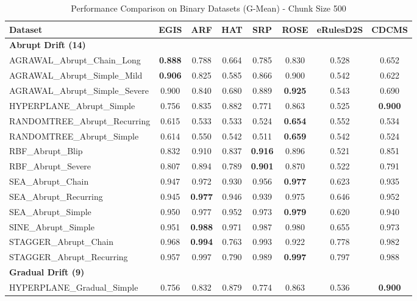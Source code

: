 \begin{table}[ht]
\centering
\caption{Performance Comparison on Binary Datasets (G-Mean) - Chunk Size 500}
\label{tab:binary_comparison}
\footnotesize
\begin{tabular}{l|ccccccc}
\toprule
\textbf{Dataset} & \textbf{EGIS} & \textbf{ARF} & \textbf{HAT} & \textbf{SRP} & \textbf{ROSE} & \textbf{eRulesD2S} & \textbf{CDCMS} \\
\midrule
\multicolumn{8}{l}{\textbf{Abrupt Drift (14)}} \\
AGRAWAL\_Abrupt\_Chain\_Long & \textbf{0.888} & 0.788 & 0.664 & 0.785 & 0.830 & 0.528 & 0.652 \\
AGRAWAL\_Abrupt\_Simple\_Mild & \textbf{0.906} & 0.825 & 0.585 & 0.866 & 0.900 & 0.542 & 0.622 \\
AGRAWAL\_Abrupt\_Simple\_Severe & 0.900 & 0.840 & 0.680 & 0.889 & \textbf{0.925} & 0.543 & 0.690 \\
HYPERPLANE\_Abrupt\_Simple & 0.756 & 0.835 & 0.882 & 0.771 & 0.863 & 0.525 & \textbf{0.900} \\
RANDOMTREE\_Abrupt\_Recurring & 0.615 & 0.533 & 0.533 & 0.524 & \textbf{0.654} & 0.552 & 0.534 \\
RANDOMTREE\_Abrupt\_Simple & 0.614 & 0.550 & 0.542 & 0.511 & \textbf{0.659} & 0.542 & 0.524 \\
RBF\_Abrupt\_Blip & 0.832 & 0.910 & 0.837 & \textbf{0.916} & 0.896 & 0.521 & 0.851 \\
RBF\_Abrupt\_Severe & 0.807 & 0.894 & 0.789 & \textbf{0.901} & 0.870 & 0.522 & 0.791 \\
SEA\_Abrupt\_Chain & 0.947 & 0.972 & 0.930 & 0.956 & \textbf{0.977} & 0.623 & 0.935 \\
SEA\_Abrupt\_Recurring & 0.945 & \textbf{0.977} & 0.946 & 0.939 & 0.975 & 0.646 & 0.952 \\
SEA\_Abrupt\_Simple & 0.950 & 0.977 & 0.952 & 0.973 & \textbf{0.979} & 0.620 & 0.940 \\
SINE\_Abrupt\_Simple & 0.951 & \textbf{0.988} & 0.971 & 0.987 & 0.980 & 0.655 & 0.973 \\
STAGGER\_Abrupt\_Chain & 0.968 & \textbf{0.994} & 0.763 & 0.993 & 0.922 & 0.778 & 0.982 \\
STAGGER\_Abrupt\_Recurring & 0.957 & 0.997 & 0.790 & 0.989 & \textbf{0.997} & 0.797 & 0.988 \\
\multicolumn{8}{l}{\textbf{Gradual Drift (9)}} \\
HYPERPLANE\_Gradual\_Simple & 0.756 & 0.832 & 0.879 & 0.774 & 0.863 & 0.536 & \textbf{0.900} \\

\end{tabular}
\end{table}
